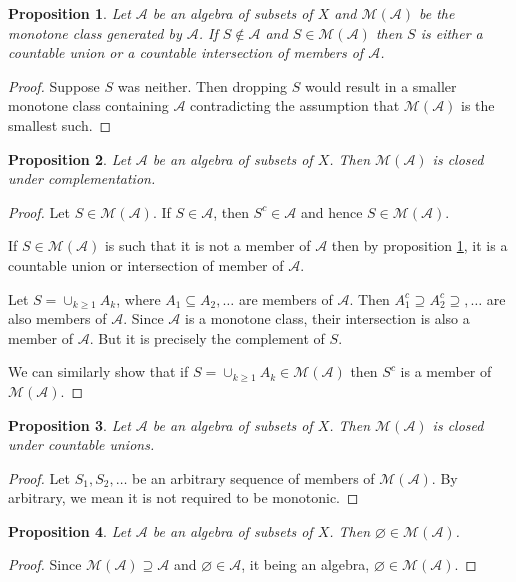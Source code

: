\documentclass{article}
\theoremstyle{plain}
\numberwithin{thm}{section}
\theoremstyle{plain}
\newtheorem{prop}{Proposition}
\numberwithin{prop}{section}
\theoremstyle{definition}
\numberwithin{defn}{section}
\theoremstyle{remark}
\theoremstyle{plain}
\numberwithin{cor}{section}
\numberwithin{equation}{section}
\begin{document}
\begin{prop}\label{s6p4}
Let $\mathcal{A}$ be an algebra of subsets of $X$ and $\mathcal{M}(\mathcal{A})$
be the monotone class generated by $\mathcal{A}$. If $S \notin \mathcal{A}$ and
$S \in \mathcal{M}(\mathcal{A})$ then $S$ is either a countable union or a 
countable intersection of members of $\mathcal{A}$.
\end{prop}
\begin{proof}
Suppose $S$ was neither. Then dropping $S$ would result in a smaller monotone 
class containing $\mathcal{A}$ contradicting the assumption that 
$\mathcal{M}(\mathcal{A})$ is the smallest such.
\end{proof}

\begin{prop}\label{s6p5}
Let $\mathcal{A}$ be an algebra of subsets of $X$. Then $\mathcal{M}(\mathcal{A})$
is closed under complementation.
\end{prop}
\begin{proof}
Let $S \in \mathcal{M}(\mathcal{A})$. If $S \in \mathcal{A}$, then $S^c \in
\mathcal{A}$ and hence $S \in \mathcal{M}(\mathcal{A})$.

If $S \in \mathcal{M}(\mathcal{A})$ is such that it is not a member of 
$\mathcal{A}$ then by proposition \ref{s6p4}, it is a countable union or 
intersection of member of $\mathcal{A}$.

Let $S = \cup_{k \ge 1}A_k$, where $A_1 \subseteq A_2, \ldots$ are members of
$\mathcal{A}$. Then $A_1^c \supseteq A_2^c \supseteq, \ldots$ are also members of
$\mathcal{A}$. Since $\mathcal{A}$ is a monotone class, their intersection is also
a member of $\mathcal{A}$. But it is precisely the complement of $S$.

We can similarly show that if $S = \cup_{k \ge 1}A_k \in \mathcal{M}(\mathcal{A})$
then $S^c$ is a member of $\mathcal{M}(\mathcal{A})$.
\end{proof}

\begin{prop}\label{s6p6}
Let $\mathcal{A}$ be an algebra of subsets of $X$. Then $\mathcal{M}(\mathcal{A})$
is closed under countable unions.
\end{prop}
\begin{proof}
Let $S_1, S_2, \ldots$ be an arbitrary sequence of members of 
$\mathcal{M}(\mathcal{A})$. By arbitrary, we mean it is not required to be 
monotonic.
\end{proof}

\begin{prop}\label{s6p7}
Let $\mathcal{A}$ be an algebra of subsets of $X$. Then $\varnothing \in
\mathcal{M}(\mathcal{A})$.
\end{prop}
\begin{proof}
Since $\mathcal{M}(\mathcal{A}) \supseteq \mathcal{A}$ and $\varnothing \in
\mathcal{A}$, it being an algebra, $\varnothing \in \mathcal{M}(\mathcal{A})$.
\end{proof}
\end{document}
